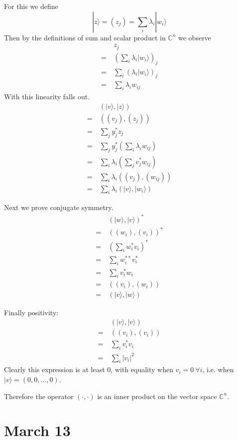 \documentclass[]{article}
\begin{document}
For this we define
\[|z\rangle = (z_j) = \sum_i\lambda_i|w_i\rangle\]
Then by the definitions of sum and scalar product in $\mathbb{C}^n$ we observe
\begin{align*}
   &z_j \\
=\ &\left(\sum_i\lambda_i|w_i\rangle\right)_j \\
=\ &\sum_i\left(\lambda_i|w_i\rangle\right)_j \\
=\ &\sum_i\lambda_iw_{ij}
\end{align*}
With this linearity falls out.
\begin{align*}
   &\left(|v\rangle, |z\rangle\right) \\
=\ &\left((v_j), (z_j)\right) \\
=\ &\sum_j y_j^*z_j \\
=\ &\sum_j y_j^*\left(\sum_i\lambda_iw_{ij}\right) \\
=\ &\sum_i\lambda_i\left(\sum_jv_j^*w_{ij}\right) \\
=\ &\sum_i\lambda_i\left((v_j), (w_{ij})\right) \\
=\ &\sum_i\lambda_i\left(|v\rangle, |w_i\rangle\right)
\end{align*}

Next we prove conjugate symmetry.
\begin{align*}
   &(|w\rangle, |v\rangle)^* \\
=\ &((w_i), (v_i))^* \\
=\ &\left(\sum_iw_i^*v_i\right)^* \\
=\ &\sum_iw_i^{**}v_i^* \\
=\ &\sum_iv_i^*w_i \\
=\ &((v_i), (w_i)) \\
=\ &(|v\rangle, |w\rangle)
\end{align*}

Finally positivity:
\begin{align*}
   &(|v\rangle, |v\rangle) \\
=\ &((v_i), (v_i)) \\
=\ &\sum_iv_i^*v_i \\
=\ &\sum_i|v_i|^2
\end{align*}
Clearly this expression is at least 0, with equality when $v_i = 0\ \forall i$, i.e. when $|v\rangle = (0, 0, \ldots, 0)$.

Therefore the operator $(\cdot, \cdot)$ is an inner product on the vector space $\mathbb{C}^n$.

\section{March 13}
\end{document}
